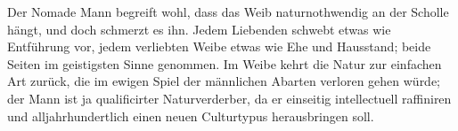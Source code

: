 Der Nomade Mann begreift wohl, dass das Weib naturnothwendig an der Scholle hängt, und doch schmerzt es ihn. Jedem Liebenden schwebt etwas wie Entführung vor, jedem verliebten Weibe etwas wie Ehe und Hausstand; beide Seiten im geistigsten Sinne genommen. Im Weibe kehrt die Natur zur einfachen Art zurück, die im ewigen Spiel der männlichen Abarten verloren gehen würde; der Mann ist ja qualificirter Naturverderber, da er einseitig intellectuell raffiniren und alljahrhundertlich einen neuen Culturtypus herausbringen soll.
\par

